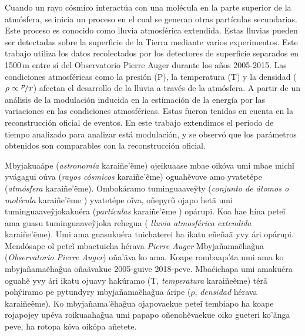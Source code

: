 \begin{resumen}%
Cuando un rayo cósmico interactúa con una molécula en la parte superior de la atmósfera, se inicia un proceso en el cual se generan otras partículas secundarias. Este proceso es conocido como lluvia atmosférica extendida. Estas lluvias pueden ser detectadas sobre la superficie de la Tierra mediante varios experimentos. Este trabajo utiliza los datos recolectados por los detectores de superficie separados en 1500\,m entre sí del Observatorio Pierre Auger durante los años 2005-2015. Las condiciones atmosféricas como la presión (P), la temperatura (T) y la densidad ($\rho \propto \nicefrac{P}{T}$) afectan el desarrollo de la lluvia a través de la atmósfera. A partir de un análisis de la modulación inducida en la estimación de la energía por las variaciones en las condiciones atmosféricas. Estas fueron tenidas en cuenta en  la reconstrucción oficial de eventos. En este trabajo extendimos el periodo de tiempo analizado para analizar está modulación, y se observó que los parámetros obtenidos son comparables con la reconstrucción oficial. 
\end{resumen}



\begin{nemombyky}%
Mbyjakua\'ape (\emph{astronomía} karaiñe'\~eme) ojeikuaase mba\textquotesingle e oik\'ova umi mba\textquotesingle e  michĩ yv\'agagui o\'uva (\emph{rayos cósmicos} karaiñe'\~eme) oguah\~evove amo yvatetépe (\emph{atmósfera} karaiñe'\~eme). Ombok\'aramo tuminguaave\textquotesingle \~yty (\emph{conjunto de átomos o molécula}  karaiñe'\~eme ) yvatetépe oĩva, oñepyr\~u ojapo het\~a umi tuminguaave\textquotesingle \~yjokaku\'era (\emph{partículas}  karaiñe'\~eme ) op\'arupi. Ko\textquotesingle a       ha\textquotesingle e  h\'ina peteĩ ama guasu tuminguaave\textquotesingle \~yjoka rehegua ( \emph{lluvia atmosf\'erica extendida} karaiñe'\~eme). Umi ama guasuku\'era tuichaterei ha ikatu eñeña\textquotesingle ã yvy ári op\'arupi. Mend\'osape oĩ peteĩ mba\textquotesingle etuicha h\'erava \emph{Pierre Auger} Mbyjañama\textquotesingle \~eha\~gua (\emph{Observatorio Pierre Auger}) oña'\~ava ko ama. Ko\textquotesingle  ape romba\textquotesingle  ap\'ota umi ama ko mbyjañama\textquotesingle \~eha\~gua oña\textquotesingle \~ava\textquotesingle  kue 2005-guive 2018-peve. Mba\textquotesingle \'eichapa umi amaku\'era oguah\~e yvy \'ari ikatu ojuavy hakúramo (T, \emph{temperatura} karaiñe\textquotesingle \~eme) tér\~a  poh\'yiramo pe pytundyry mbyjañama\textquotesingle \~eha\~gua áripe ($\rho$, \emph{densidad} h\'erava karaiñe\textquotesingle \~eme). Ko mbyjañama'\~eha\~gua ojapova\textquotesingle ekue peteĩ tembiapo ha ko\textquotesingle ape rojapojey up\'eva roikuaaha\~gua umi papapo oñenoh\~eva\textquotesingle ekue oiko gueteri ko'\~anga peve, ha rotopa kóva oikópa añetete.
\end{nemombyky}



